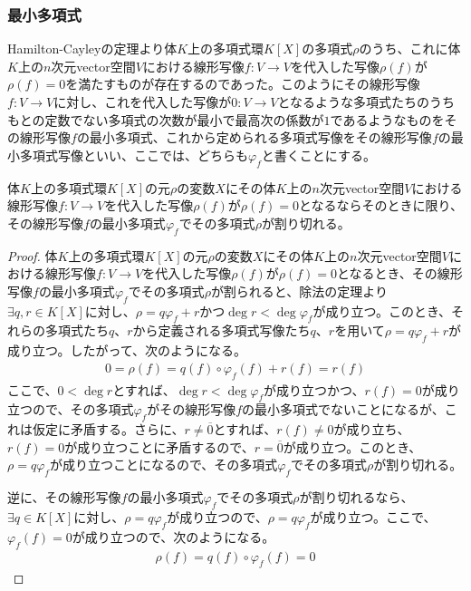 \documentclass[dvipdfmx]{jsarticle}
\begin{document}
\subsubsection{最小多項式}%
\begin{dfn}
Hamilton-Cayleyの定理より体$K$上の多項式環$K[ X]$の多項式$\rho$のうち、これに体$K$上の$n$次元vector空間$V$における線形写像$f:V \rightarrow V$を代入した写像$\rho(f)$が$\rho(f) = 0$を満たすものが存在するのであった。このようにその線形写像$f:V \rightarrow V$に対し、これを代入した写像が$0:V \rightarrow V$となるような多項式たちのうちもとの定数でない多項式の次数が最小で最高次の係数が$1$であるようなものをその線形写像$f$の最小多項式、これから定められる多項式写像をその線形写像$f$の最小多項式写像といい、ここでは、どちらも$\varphi_{f}$と書くことにする。
\end{dfn}
\begin{thm}\label{2.2.6.5}
体$K$上の多項式環$K[ X]$の元$\rho$の変数$X$にその体$K$上の$n$次元vector空間$V$における線形写像$f:V \rightarrow V$を代入した写像$\rho(f)$が$\rho(f) = 0$となるならそのときに限り、その線形写像$f$の最小多項式$\varphi_{f}$でその多項式$\rho$が割り切れる。
\end{thm}
\begin{proof}
体$K$上の多項式環$K[ X]$の元$\rho$の変数$X$にその体$K$上の$n$次元vector空間$V$における線形写像$f:V \rightarrow V$を代入した写像$\rho(f)$が$\rho(f) = 0$となるとき、その線形写像$f$の最小多項式$\varphi_{f}$でその多項式$\rho$が割られると、除法の定理より$\exists q,r \in K[ X]$に対し、$\rho = q\varphi_{f} + r$かつ$\deg{r} < \deg{\varphi_{f}}$が成り立つ。このとき、それらの多項式たち$q$、$r$から定義される多項式写像たち$q$、$r$を用いて$\rho = q\varphi_{f} + r$が成り立つ。したがって、次のようになる。
\begin{align*}
0 = \rho(f) = q(f) \circ \varphi_{f}(f) + r(f) = r(f)
\end{align*}
ここで、$0 < \deg{r}$とすれば、$\deg{r} < \deg{\varphi_{f}}$が成り立つかつ、$r(f) = 0$が成り立つので、その多項式$\varphi_{f}$がその線形写像$f$の最小多項式でないことになるが、これは仮定に矛盾する。さらに、$r \neq \overline{0}$とすれば、$r(f) \neq 0$が成り立ち、$r(f) = 0$が成り立つことに矛盾するので、$r = \overline{0}$が成り立つ。このとき、$\rho = q\varphi_{f}$が成り立つことになるので、その多項式$\varphi_{f}$でその多項式$\rho$が割り切れる。\par
逆に、その線形写像$f$の最小多項式$\varphi_{f}$でその多項式$\rho$が割り切れるなら、$\exists q \in K[ X]$に対し、$\rho = q\varphi_{f}$が成り立つので、$\rho = q\varphi_{f}$が成り立つ。ここで、$\varphi_{f}(f) = 0$が成り立つので、次のようになる。
\begin{align*}
\rho(f) = q(f) \circ \varphi_{f}(f) = 0
\end{align*}
\end{proof}
\end{document}
